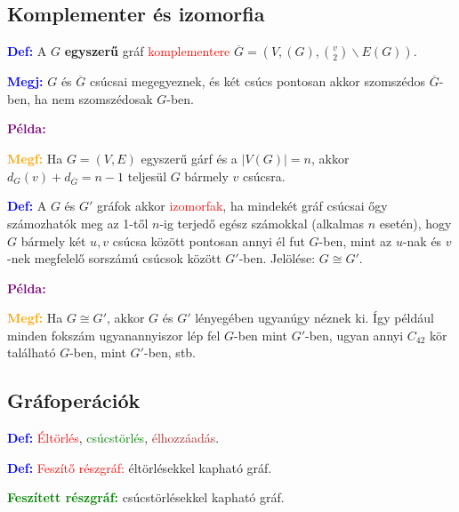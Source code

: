 \documentclass[../szamtud.tex]{subfiles}
\begin{document}
    \subsection{Komplementer és izomorfia}

        \textcolor{blue}{\textbf{Def:}}	A $G$ \textbf{egyszerű} gráf \textcolor{red}{komplementere} $\overline{G} = (V,(G), \binom{v}{2} \backslash E(G))$.

        \textcolor{blue}{\textbf{Megj:}} $G$ és $\overline{G}$ csúcsai megegyeznek, és két csúcs pontosan akkor szomszédos $\overline{G}$-ben, ha nem szomszédosak $G$-ben.

        \textcolor{purple}{\textbf{Példa:}}

        \textcolor{orange}{\textbf{Megf:}} Ha $G = (V,E)$ egyszerű gárf és a $|V(G)| = n$, akkor $d_G(v)+d_{\overline{G}}=n-1$ teljesül $G$ bármely $v$ csúcsra.


        \textcolor{blue}{\textbf{Def:}} A $G$ és $G'$ gráfok akkor \textcolor{red}{izomorfak}, ha mindekét gráf csúcsai őgy számozhatók meg az 1-től $n$-ig terjedő egész számokkal (alkalmas $n$ esetén), hogy $G$ bármely két $u,v$ csúcsa között pontosan annyi él fut $G$-ben, mint az $u$-nak és $v$-nek megfelelő sorszámú csúcsok között $G'$-ben. Jelölése: $G \cong G'$.
        
        \textcolor{purple}{\textbf{Példa:}}

        \textcolor{orange}{\textbf{Megf:}} Ha $G \cong G'$, akkor $G$ és $G'$ lényegében ugyanúgy néznek ki. Így például minden fokszám ugyanannyiszor lép fel $G$-ben mint $G'$-ben, ugyan annyi $C_{42}$ kör található $G$-ben, mint $G'$-ben, stb.

    \subsection{Gráfoperációk}

        \textcolor{blue}{\textbf{Def:}} \textcolor{red}{Éltörlés}, \textcolor{green}{csúcstörlés}, \textcolor{brown}{élhozzáadás}.

        \textcolor{blue}{\textbf{Def:}} \textcolor{red}{Feszítő részgráf:} éltörlésekkel kapható gráf.

        \textcolor{green}{\textbf{Feszített részgráf:}} csúcstörlésekkel kapható gráf.
\end{document}
